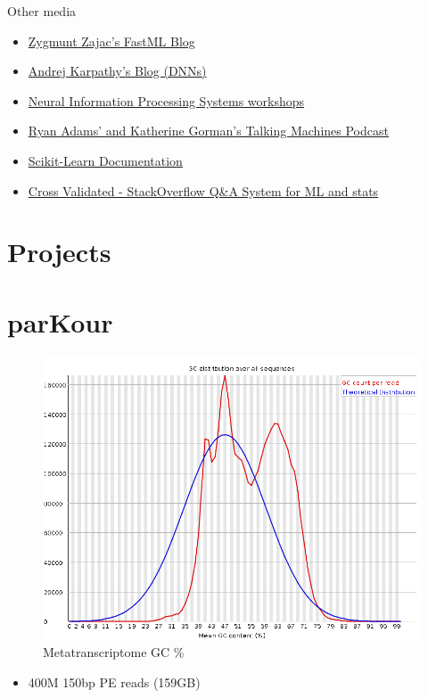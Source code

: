 \documentclass[ignorenonframetext,]{beamer}
\begin{document}
\begin{frame}{Other media}

\begin{itemize}
\itemsep1pt\parskip0pt
\item
  \href{http://fastml.com/}{Zygmunt Zajac's FastML Blog}
\item
  \href{http://karpathy.github.io/}{Andrej Karpathy's Blog (DNNs)}
\item
  \href{https://nips.cc}{Neural Information Processing Systems
  workshops}
\item
  \href{http://www.thetalkingmachines.com}{Ryan Adams' and Katherine
  Gorman's Talking Machines Podcast}
\item
  \href{http://scikit-learn.org/stable/}{Scikit-Learn Documentation}
\item
  \href{http://stats.stackexchange.com/}{Cross Validated - StackOverflow
  Q\&A System for ML and stats}
\end{itemize}

\end{frame}

\section{Projects}\label{projects}

\section{parKour}\label{parkour}

\begin{frame}

\begin{figure}[htbp]
\centering
\includegraphics{assets/presentation/GIML/gc.png}
\caption{Metatranscriptome GC \%}
\end{figure}

\begin{itemize}
\itemsep1pt\parskip0pt
\item
  400M 150bp PE reads (159GB)
\end{itemize}

\end{frame}
\end{document}
